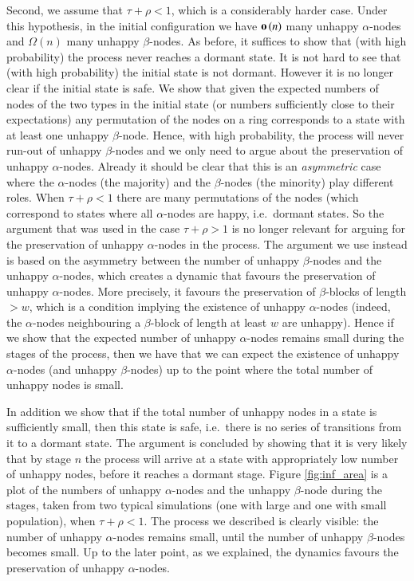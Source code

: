 \documentclass[11pt]{article}
\theoremstyle{plain}
\numberwithin{equation}{subsection}
\newcommand{\smo}[1]{\mathop{\bf o}\/\left({#1}\right)}
\begin{document}
Second, we assume that $\tau+\rho<1$, which is a considerably harder case.
Under this hypothesis, in the initial configuration we have
$\smo{n}$ many unhappy $\alpha$-nodes and
$\Omega(n)$ many unhappy $\beta$-nodes.
As before, it suffices to show that (with high probability) the process never reaches a
dormant state. It is not hard to see that (with high probability) the initial state is not dormant.
However it is no longer clear if the initial state is safe. We show  
that given the expected numbers of nodes of the two types in the initial
state (or numbers sufficiently close to their expectations) any permutation of the nodes
on a ring corresponds to a state with at least one unhappy $\beta$-node.
Hence, with high probability, the process will never run-out 
of unhappy $\beta$-nodes and we only need
to argue about the preservation of unhappy $\alpha$-nodes.
Already it should be clear that this is an {\em asymmetric} case where the 
$\alpha$-nodes (the majority) and the $\beta$-nodes (the minority) play different roles.
When $\tau+\rho<1$ there are many permutations of the nodes 
(which correspond to states where all $\alpha$-nodes
are happy, i.e.\ dormant states. So the argument that was used in the case 
$\tau+\rho>1$ is no longer 
relevant for arguing for the preservation of unhappy $\alpha$-nodes in the process.
The argument we use instead is based on the asymmetry between the number of unhappy
$\beta$-nodes and the unhappy $\alpha$-nodes, which creates a dynamic that favours
the preservation of unhappy $\alpha$-nodes. More precisely, it favours the preservation of
$\beta$-blocks of length $>w$, which is a condition implying the existence of unhappy
$\alpha$-nodes (indeed, the $\alpha$-nodes 
neighbouring a $\beta$-block of length at least $w$
are unhappy). Hence if we show that the expected number of unhappy $\alpha$-nodes remains
small during the stages of the process,
 then we have that we can expect the existence of unhappy $\alpha$-nodes 
 (and unhappy $\beta$-nodes) up to the point where the total number of unhappy nodes
 is small.

In addition we show that if the
total number of unhappy nodes in a state is sufficiently small, then
this state is safe, i.e.\ there is no series of transitions from it to a dormant state.
The argument is concluded by showing that it is very likely that by stage $n$ the process
will arrive at a state with appropriately low number of unhappy nodes, before it reaches 
a dormant stage.
Figure \ref{fig:inf_area} is a plot of the numbers of unhappy $\alpha$-nodes
and the unhappy $\beta$-node during the stages, taken from two typical simulations
(one with large and one with small population), when $\tau+\rho<1$.
The process we described is clearly visible: the number of unhappy $\alpha$-nodes
remains small, until the number of unhappy $\beta$-nodes becomes small.
Up to the later point, as we explained, the dynamics favours the preservation of unhappy
$\alpha$-nodes.
\end{document}
